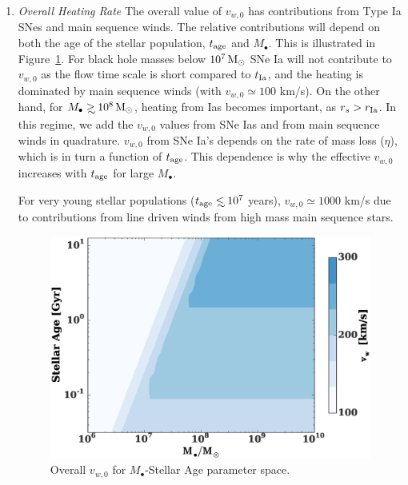 \documentclass[usenatbib,fleqn]{mn2e}
\newcommand\lsim{\mathrel{\rlap{\lower4pt\hbox{\hskip1pt$\sim$}}
        \raise1pt\hbox{$<$}}}
\newcommand\gsim{\mathrel{\rlap{\lower4pt\hbox{\hskip1pt$\sim$}}
        \raise1pt\hbox{$>$}}}
\newcommand{\rs}{r_s}
\newcommand{\Mbh}[1][]{M_{\bullet#1}}
\newcommand{\rIa}{r_{\rm Ia}}
\newcommand{\vwO}{v_{w,0}}
\newcommand{\tage}{t_{\rm age}}
\begin{document}
\begin{enumerate}
\item \emph{Overall Heating Rate} The overall value of $\vwO$ has
  contributions from Type Ia SNes and main sequence winds.  The
  relative contributions will depend on both the age of the stellar
  population, $t_{\rm age}$ and $\Mbh$.  This is illustrated in
  Figure~\ref{fig:vweff}. For black hole masses below $10^7 \,{\rm M_\odot}$ SNe
  Ia will not contribute to $\vwO$ as the flow time scale is short
  compared to $t_{\rm Ia}$, and the heating is dominated by main
  sequence winds (with $\vwO\simeq 100$ km/s).  On the other hand, for
  $\Mbh \gsim 10^8 \Msun$, heating from Ias becomes important, as
  $\rs>\rIa$.  In this regime, we add the $\vwO$ values from SNe Ias
  and from main sequence winds in quadrature. $\vwO$ from SNe Ia's
  depends on the rate of mass loss ($\eta$), which is in turn a
  function of $t_{\rm age}$. This dependence is why the effective
  $\vwO$ increases with $\tage$ for large $\Mbh$.

For very young stellar populations ($\tage \lsim 10^7$ years),
$\vwO\simeq 1000$ km/s due to contributions from line driven winds
from high mass main sequence stars.

\begin{figure}
\includegraphics[width=\columnwidth]{vw-contour.eps}
\caption{\label{fig:vweff} Overall $\vwO$ for $\Mbh$-Stellar Age parameter space.}
\end{figure}

\end{enumerate}
\end{document}
